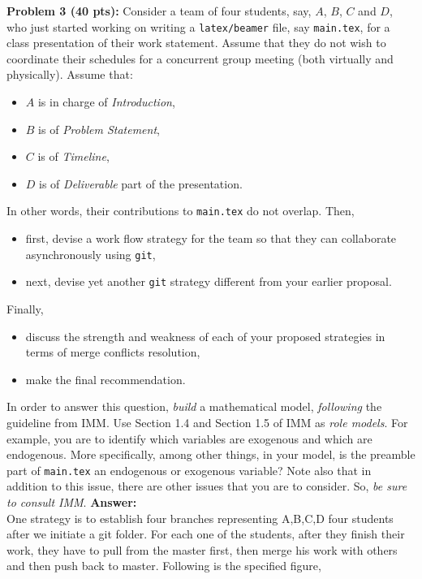 \documentclass[12pt]{article}
\begin{document}
\newpage
\noindent\textbf{Problem 3 (40 pts):}
Consider a team of four students, say, $A$, $B$, $C$ and $D$, 
who just started working 
on writing a \texttt{latex/beamer} file, say \texttt{main.tex}, 
for a class presentation of their work statement.  
Assume that they do not wish to coordinate their schedules for a
concurrent group meeting (both virtually and physically).  
Assume that:
\begin{itemize}
\item $A$ is in charge of \emph{Introduction},
\item $B$ is of \emph{Problem Statement}, 
\item $C$ is of  \emph{Timeline},
\item $D$ is of \emph{Deliverable} part of the presentation.  
\end{itemize}
In other words, their contributions to \texttt{main.tex} do not overlap.
Then, 
\begin{itemize}
\item first, devise a work flow strategy for the team so that they can
  collaborate asynchronously using \texttt{git},
\item next, devise yet another \texttt{git} strategy different from your earlier
  proposal.  
\end{itemize}
Finally,
\begin{itemize}
\item discuss the strength and weakness of each of your proposed strategies in terms of merge
conflicts resolution,
\item make the final recommendation.  
\end{itemize}
In order to answer this question, \emph{build}
a mathematical model, \emph{following} the guideline from IMM. 
Use Section 1.4 and Section 1.5 of IMM as \emph{role models}.    
For example, you are to identify which variables  are exogenous 
and which are endogenous.  More specifically, among other things, 
in your model, is the preamble part of \texttt{main.tex} an endogenous 
or exogenous variable?  
Note also that in addition to this issue, there are other issues that
you are to consider.  So, \emph{be sure to consult IMM}. 
\noindent\textbf{Answer:}  \\
\noindent One strategy is to establish four branches representing A,B,C,D four students after we initiate a git folder. For each one of the students, after they finish their work, they have to pull from the master first, then merge his work with others and then push back to master. Following is the specified figure,
\end{document}

